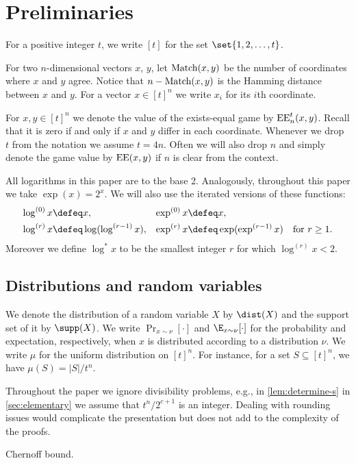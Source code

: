 \section{Preliminaries}
\label{sec:preliminaries}
For a positive integer $t$, we write $[t]$ for the set $\set{1,2,\ldots,t}$.

For two $n$-dimensional vectors $x$, $y$, let
$\operatorname{Match}(x,y)$ be the number of coordinates where $x$ and $y$
agree. Notice that $n-\operatorname{Match}(x,y)$ is the Hamming distance
between $x$ and $y$. For a vector $x\in[t]^n$ we write $x_i$ for
its $i$\/th coordinate. 

For $x,y\in [t]^n$ we denote the value of the exists-equal game
by $\operatorname{EE}_n^t(x,y)$. Recall that it is zero if and only if $x$ and
$y$ differ in each coordinate. Whenever we drop $t$ from the
notation we assume $t=4n$. Often we will also drop $n$ and
simply denote the game value by $\operatorname{EE}(x,y)$ if $n$ is clear from
the context.

All logarithms in this paper are to the base 2. Analogously,
throughout this paper we take $\exp(x)=2^x$. We will also use
the iterated versions of these functions:
\begin{align*}
\log^{(0)}x&\defeq x, & \exp^{(0)}x&\defeq x,\\
\log^{(r)}x&\defeq \log(\log^{(r-1)}x), & \exp^{(r)}x&\defeq \exp(\exp^{(r-1)}x)
\quad\text{for $r\geq 1$}.
\end{align*}
Moreover we define $\log^* x$ to be the smallest integer $r$ for which
$\log^{(r)} x<2$. 


\subsection{Distributions and random variables}
We denote the distribution of a random
variable $X$ by $\dist(X)$ and the support set of it by
$\supp(X)$. We write $\Pr_{x\sim\nu}[\cdot]$ and
$\E_{x\sim\nu}[\cdot]$ for the probability and expectation,
respectively, when $x$ is distributed according to a
distribution $\nu$. We write $\mu$ for the uniform distribution
on $[t]^n$. For instance, for a set $S\subseteq [t]^n$, we have
$\mu(S) = |S| / t^n$.

Throughout the paper we ignore divisibility problems, e.g., in
\autoref{lem:determine-s} in \autoref{sec:elementary} we assume
that $t^n/2^{c+1}$ is an integer. Dealing with rounding issues
would complicate the presentation but does not add to the
complexity of the proofs.
\begin{theorem}
Chernoff bound.
\end{theorem}

